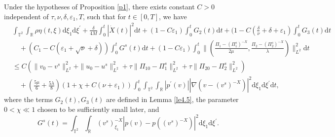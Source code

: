 \documentclass[10pt,a4paper]{amsart}
\newcommand{\dif}{\mathrm{d}}
\begin{document}
\begin{lemma}\label{le0}
Under the hypotheses of Proposition \ref{p1}, there exists constant $C>0$ independent of $\tau, \nu, \delta, \varepsilon_1, T$, such that for $t\in[0, T]$, we have
\begin{equation}\label{ljgu1.1}
\begin{aligned}
& \int_{\mathbb{T}^2}\int_{\mathbb{R}}\rho\eta(t,\xi)\dif \xi_1\dif \xi^{\prime}
+\frac{\delta}{4M}\int_0^t|\dot X(t)|^2\dif t
+(1-C\varepsilon_1)\int_0^tG_2(t)\dif t
+(1-C(\frac{\delta}{\nu}+\delta+\varepsilon_1)\int_0^tG_3(t)\dif t\\
&\quad
+(C_1-C(\varepsilon_1+\sqrt\nu+\delta))\int_0^tG^s(t)\dif t
+(1-C\varepsilon_1)\int_0^t\|(\frac{\Pi_1-(\Pi_1^s)^{-X}}{2\mu}, \frac{\Pi_2-(\Pi_2^s)^{-X}}{\lambda})\|_{L^2}^2\dif t\\
&\le C\left(\|v_0-v^s\|_{L^2}^2+\|u_0-u^s\|_{L^2}^2+\tau\|\Pi_{10}-\Pi_1^s\|_{L^2}^2
+\tau\|\Pi_{20}-\Pi_2^s\|_{L^2}^2\right)\\
&\quad+(\frac{5\mu}{6}+\frac{5\lambda}{8})(1+\chi+C(\nu+\varepsilon_1))\int_0^t\int_{\mathbb{T}^2}\int_{\mathbb{R}}
|p^\prime(v)||\nabla(v-(v^s)^{-X})|^2
\dif \xi_1\dif \xi^{\prime}\dif t,
\end{aligned}
\end{equation}
where the terms $G_2(t),  G_{3}(t)$ are defined in Lemma \ref{le4.5}, the parameter $0<\chi\ll 1$ chosen to be sufficiently small later, and
\[
G^s(t)=\int_{\mathbb{T}^2}\int_{\mathbb{R}}(v^s)^{-X}_{\xi_1}|p(v)-p((v^s)^{-X})|^2\dif \xi_1\dif \xi^{\prime}.
\]
\end{lemma}
\end{document}
